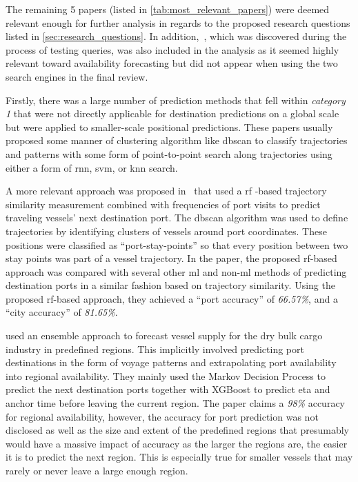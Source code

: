 The remaining \textbf{}5 papers (listed in \cref{tab:most_relevant_papers}) were deemed relevant enough for further analysis in regards to the proposed research questions listed in \cref{sec:research_questions}. In addition,~\cite{lechtenberg2019}, which was discovered during the process of testing queries, was also included in the analysis as it seemed highly relevant toward availability forecasting but did not appear when using the two search engines in the final review.


Firstly, there was a large number of prediction methods that fell within \textit{category 1} that were not directly applicable for destination predictions on a global scale but were applied to smaller-scale positional predictions. These papers usually proposed some manner of clustering algorithm like \acrshort{dbscan} to classify trajectories and patterns with some form of point-to-point search along trajectories using either a form of \acrfull{rnn}, \acrfull{svm}, or \acrfull{knn} search.

A more relevant approach was proposed in~\cite{Zhang2020AISApproach} that used a \acrfull{rf} -based trajectory similarity measurement combined with frequencies of port visits to predict traveling vessels' next destination port. The \acrshort{dbscan} algorithm was used to define trajectories by identifying clusters of vessels around port coordinates. These positions were classified as ``port-stay-points'' so that every position between two stay points was part of a vessel trajectory. In the paper, the proposed \acrshort{rf}-based approach was compared with several other \acrshort{ml} and non-\acrshort{ml} methods of predicting destination ports in a similar fashion based on trajectory similarity. Using the proposed \acrshort{rf}-based approach, they achieved a ``port accuracy'' of \textit{66.57\%}, and a ``city accuracy'' of \textit{81.65\%}.

\cite{lechtenberg2019} used an ensemble approach to forecast vessel supply for the dry bulk cargo industry in predefined regions. This implicitly involved predicting port destinations in the form of voyage patterns and extrapolating port availability into regional availability. They mainly used the Markov Decision Process to predict the next destination ports together with XGBoost to predict \acrshort{eta} and anchor time before leaving the current region. The paper claims a \textit{98\%} accuracy for regional availability, however, the accuracy for port prediction was not disclosed as well as the size and extent of the predefined regions that presumably would have a massive impact of accuracy as the larger the regions are, the easier it is to predict the next region. This is especially true for smaller vessels that may rarely or never leave a large enough region.

